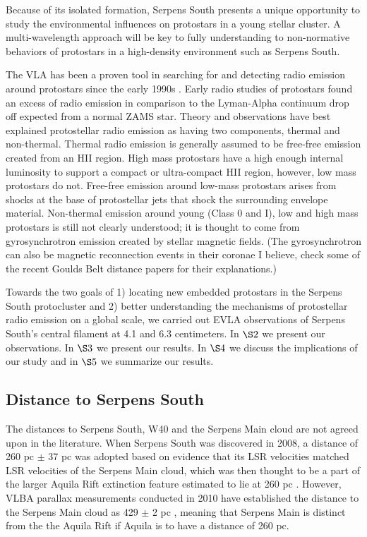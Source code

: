 \documentclass[apj]{emulateapj}
\begin{document}
	Because of its isolated formation, Serpens South presents a unique opportunity to study the environmental influences on protostars in a young stellar cluster. A multi-wavelength approach will be key to fully understanding to non-normative behaviors of protostars in a high-density environment such as Serpens South.
	 
	The VLA has been a proven tool in searching for and detecting radio emission around protostars since the early 1990s \citep[e.g.,][]{Curiel89, Anglada98, Reipurth99, Beltran01, Eiroa05, Shirley07, Rodriguez10}. Early radio studies of protostars found an excess of radio emission in comparison to the Lyman-Alpha continuum drop off expected from a normal ZAMS star. Theory and observations have best explained protostellar radio emission as having two components, thermal and non-thermal. Thermal radio emission is generally assumed to be free-free emission created from an HII region. High mass protostars have a high enough internal luminosity to support a compact or ultra-compact HII region, however, low mass protostars do not. Free-free emission around low-mass protostars arises from shocks at the base of protostellar jets that shock the surrounding envelope material. Non-thermal emission around young (Class 0 and I), low and high mass protostars is still not clearly understood; it is thought to come from gyrosynchrotron emission created by stellar magnetic fields. (The gyrosynchrotron can also be magnetic reconnection events in their coronae I believe, check some of the recent Goulds Belt distance papers for their explanations.) %

	Towards the two goals of 1) locating new embedded protostars in the Serpens South protocluster and 2) better understanding the mechanisms of protostellar radio emission on a global scale, we carried out EVLA observations of Serpens South's central filament at 4.1 and 6.3 centimeters. In $\S 2$ we present our observations. In $\S 3$ we present our results. In $\S 4$ we discuss the implications of our study and in $\S 5$ we summarize our results.

\subsection{Distance to Serpens South}
\label{subsec:distance to serpens south}

The distances to Serpens South, W40 and the Serpens Main cloud are not agreed upon in the literature. When Serpens South was discovered in 2008, a distance of 260 pc $\pm$ 37 pc was adopted based on evidence that its LSR velocities matched LSR velocities of the Serpens Main cloud, which was then thought to be a part of the larger Aquila Rift extinction feature estimated to lie at 260 pc \citep{Straizys03}. However, VLBA parallax measurements conducted in 2010 have established the distance to the Serpens Main cloud as 429 $\pm$ 2 pc \citep{Dzib11}, meaning that Serpens Main is distinct from the the Aquila Rift if Aquila is to have a distance of 260 pc. 
\end{document}
